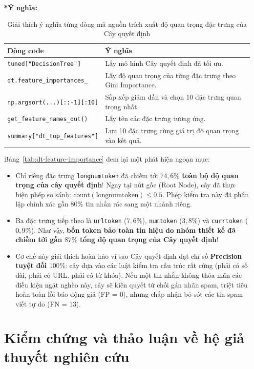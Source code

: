 \noindent\textbf{*Ý nghĩa:}
\begin{table}[H]
\centering
\caption{Giải thích ý nghĩa từng dòng mã nguồn trích xuất độ quan trọng đặc trưng của Cây quyết định}
\label{tab:dt-code-meaning}
\begin{tabular}{|p{5.5cm}|p{8.5cm}|}
\hline
\textbf{Dòng code} & \textbf{Ý nghĩa} \\
\hline
\texttt{tuned["DecisionTree"]} & Lấy mô hình Cây quyết định đã tối ưu. \\
\hline
\texttt{dt.feature\_importances\_} & Lấy độ quan trọng của từng đặc trưng theo Gini Importance. \\
\hline
\texttt{np.argsort(...)[::-1][:10]} & Sắp xếp giảm dần và chọn 10 đặc trưng quan trọng nhất. \\
\hline
\texttt{get\_feature\_names\_out()} & Lấy tên các đặc trưng tương ứng. \\
\hline
\texttt{summary["dt\_top\_features"]} & Lưu 10 đặc trưng cùng giá trị độ quan trọng vào kết quả. \\
\hline
\end{tabular}
\end{table}

Bảng~\ref{tab:dt-feature-importance} đem lại một phát hiện ngoạn mục:
\begin{itemize}
    \item Chỉ riêng đặc trưng \texttt{longnumtoken} đã chiếm tới \textbf{$74,6\%$ toàn bộ độ quan trọng của cây quyết định}! Ngay tại nút gốc (Root Node), cây đã thực hiện phép so sánh: $\text{count}(\text{longnumtoken}) \le 0.5$. Phép kiểm tra này đã phân lập chính xác gần 80\% tin nhắn rác sang một nhánh riêng.
    \item Ba đặc trưng tiếp theo là \texttt{urltoken} ($7,6\%$), \texttt{numtoken} ($3,8\%$) và \texttt{currtoken} ($0,9\%$). Như vậy, \textbf{bốn token bảo toàn tín hiệu do nhóm thiết kế đã chiếm tới gần $87\%$ tổng độ quan trọng của Cây quyết định}!
    \item Cơ chế này giải thích hoàn hảo vì sao Cây quyết định đạt chỉ số \textbf{Precision tuyệt đối $100\%$}: cây dựa vào các luật kiểm tra cấu trúc rất cứng (phải có số dài, phải có URL, phải có từ khóa). Nếu một tin nhắn không thỏa mãn các điều kiện ngặt nghèo này, cây sẽ kiên quyết từ chối gán nhãn spam, triệt tiêu hoàn toàn lỗi báo động giả (FP = 0), nhưng chấp nhận bỏ sót các tin spam viết tự do (FN = 13).
\end{itemize}

\section{Kiểm chứng và thảo luận về hệ giả thuyết nghiên cứu}
\label{sec:kiem-chung-gia-thuyet}

